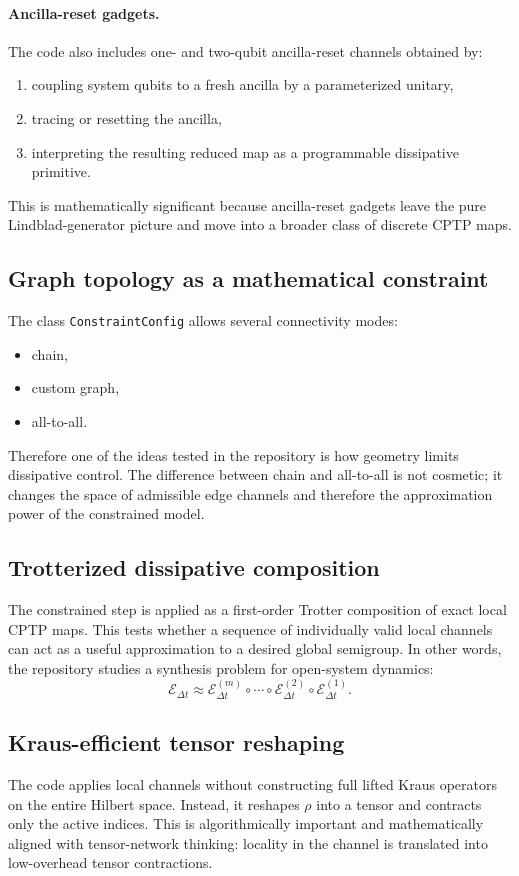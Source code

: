 \documentclass[11pt,a4paper]{article}
\begin{document}
\paragraph{Ancilla-reset gadgets.}
The code also includes one- and two-qubit ancilla-reset channels obtained by:
\begin{enumerate}[label=\alph*.]
  \item coupling system qubits to a fresh ancilla by a parameterized unitary,
  \item tracing or resetting the ancilla,
  \item interpreting the resulting reduced map as a programmable dissipative primitive.
\end{enumerate}

This is mathematically significant because ancilla-reset gadgets leave the pure Lindblad-generator picture and move into a broader class of discrete CPTP maps.

\subsection{Graph topology as a mathematical constraint}
The class \texttt{ConstraintConfig} allows several connectivity modes:
\begin{itemize}
  \item chain,
  \item custom graph,
  \item all-to-all.
\end{itemize}
Therefore one of the ideas tested in the repository is how geometry limits dissipative control. The difference between chain and all-to-all is not cosmetic; it changes the space of admissible edge channels and therefore the approximation power of the constrained model.

\subsection{Trotterized dissipative composition}
The constrained step is applied as a first-order Trotter composition of exact local CPTP maps. This tests whether a sequence of individually valid local channels can act as a useful approximation to a desired global semigroup. In other words, the repository studies a synthesis problem for open-system dynamics:
\[
\mathcal{E}_{\Delta t}
\approx
\mathcal{E}^{(m)}_{\Delta t}\circ\cdots\circ \mathcal{E}^{(2)}_{\Delta t}\circ \mathcal{E}^{(1)}_{\Delta t}.
\]

\subsection{Kraus-efficient tensor reshaping}
The code applies local channels without constructing full lifted Kraus operators on the entire Hilbert space. Instead, it reshapes $\rho$ into a tensor and contracts only the active indices. This is algorithmically important and mathematically aligned with tensor-network thinking: locality in the channel is translated into low-overhead tensor contractions.
\end{document}
